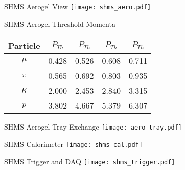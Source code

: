 \begin{Mfigure}{SHMS Aerogel View}
  \centering
  \texttt{[image: shms\_aero.pdf]}
  \caption{View of the SHMS aerogel Cerenkov. [\cite{horn_aerogel_2017}]}
  \label{fig:2-4_shms_aero}
\end{Mfigure}

\begin{Mtable}{SHMS Aerogel Threshold Momenta}
  \centering
  \begin{tabular}{|c|c|c|c|c|}
    \hline
    \textbf{Particle} & \textbf{$P_{Th}$} & \textbf{$P_{Th}$} & \textbf{$P_{Th}$} & \textbf{$P_{Th}$} \\
    \hline
    $\mu$ & 0.428 & 0.526 & 0.608 & 0.711 \\
    $\pi$ & 0.565 & 0.692 & 0.803 & 0.935 \\
    $K$ & 2.000 & 2.453 & 2.840 & 3.315 \\
    $p$ & 3.802 & 4.667 & 5.379 & 6.307 \\
    \hline
  \end{tabular}
  \caption{Threshold momenta ($P_{Th}$ in GeV/c) for a variety of charged particles and the corresponding refractive indices.}
  \label{tab:2-4_aero_threshold}
\end{Mtable}

\begin{Mfigure}{SHMS Aerogel Tray Exchange}
  \centering
  \texttt{[image: aero\_tray.pdf]}
  \caption{View of an aerogel tray being lifted out of the SHMS hut. The tray maintains its 18$\degree$ angle until it is slowly lowerd on the pallet.}
  \label{fig:2-4_aero_tray}
\end{Mfigure}

\begin{Mfigure}{SHMS Calorimeter}
  \centering
  \texttt{[image: shms\_cal.pdf]}
  \caption{View of the SHMS calorimeter which shows the preshow and shower, along with their corresponding lead glass blocks. [\cite{mkrtchyan_lead-glass_2013}]}
  \label{fig:2-4_shms_cal}
\end{Mfigure}

%
%

\begin{Mfigure}{SHMS Trigger and DAQ}
  \centering
  \texttt{[image: shms\_trigger.pdf]}
  \caption{Overview of the SHMS trigger and DAQ system. The HMS shares a similar trigger and DAQ system. [\cite{sawatzky_shms_2011}]}
  \label{fig:2-5_shms_trigger}
\end{Mfigure}

